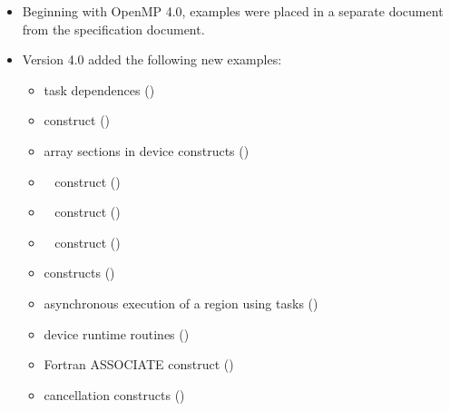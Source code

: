 \begin{itemize}
\item Beginning with OpenMP 4.0, examples were placed in a separate document
      from the specification document.
\item Version 4.0 added the following new examples:

\begin{itemize}
\item task dependences                       ()
\item {} construct                ()
\item array sections in device constructs    ()
\item {}~ construct    ()
\item {}~ construct  ()
\item {}~ construct ()
\item {} constructs                ()
\item asynchronous execution of a  region using tasks ()
\item device runtime routines                ()
\item Fortran ASSOCIATE construct            ()
\item cancellation constructs                ()
\end{itemize}

\end{itemize}
